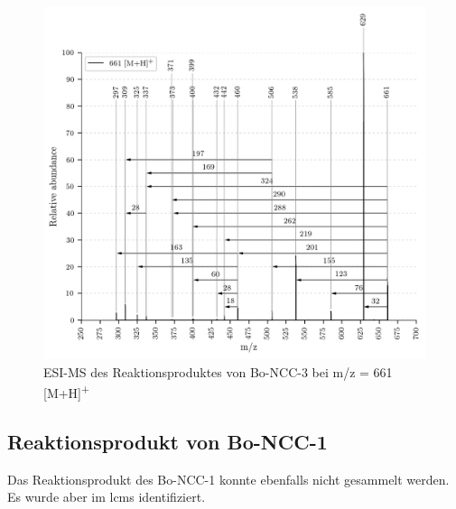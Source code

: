 \begin{figure}[!htbp]
  \centering
  \includegraphics[width=\textwidth, height=0.7\textwidth]{figures/Kapitel7/Kataboliten/VWA_MS_661.png}
  \caption[ESI-MS des Reaktionsproduktes von Bo-NCC-3, Quelle: Author]{ESI-MS des Reaktionsproduktes von Bo-NCC-3 bei m/z = 661 [M+H]\textsuperscript{+}}
  \label{fig:661MH}
\end{figure}

\pagebreak
\subsection{Reaktionsprodukt von Bo-NCC-1}

Das Reaktionsprodukt des Bo-NCC-1 konnte ebenfalls nicht gesammelt werden. Es wurde aber im \gls{lcms} identifiziert.
